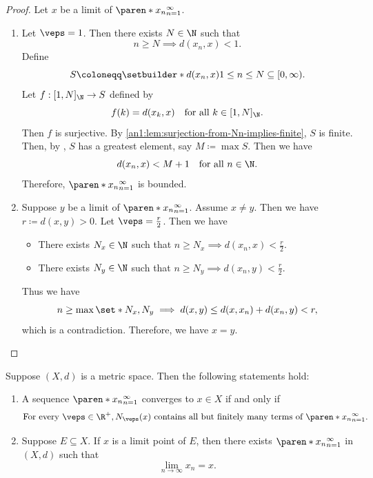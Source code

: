 \begin{proof}
  Let $x$ be a limit of $\paren*{x_{n}}_{n = 1}^{\infty}$.
  \begin{enumerate}[label=\textbf{(\Alph*)}]
    \item Let $\veps = 1$. Then there exists $N \in \N$ such that
          \[
            n \geq N \implies d(x_{n}, x) < 1.
          \]
          Define
          \[
            S \coloneqq \setbuilder*{d(x_{n}, x)}{1 \leq n \leq N} \subseteq [0, \infty).
          \]
          Let $f: [1, N]_{\N} \to S$ defined by
          \[
            f(k) = d(x_{k}, x) \quad \text{for all } k \in [1, N]_{\N}.
          \]
          Then $f$ is surjective. By \cref{an1:lem:surjection-from-Nn-implies-finite}, $S$ is finite. Then, by
          , $S$ has a greatest element, say $M \coloneqq \max S$. Then we have
          \[
            d(x_{n}, x) < M + 1 \quad \text{for all } n \in \N.
          \]
          Therefore, $\paren*{x_{n}}_{n = 1}^{\infty}$ is bounded.
    \item Suppose $y$ be a limit of $\paren*{x_{n}}_{n = 1}^{\infty}$. Assume $x \neq y$.
          Then we have $r \coloneqq d(x, y) > 0$. Let $\veps = \frac{r}{2}$. Then we have
          \begin{itemize}
            \item There exists $N_{x} \in \N$ such that $n \geq N_{x} \implies d(x_{n}, x) < \frac{r}{2}$.
            \item There exists $N_{y} \in \N$ such that $n \geq N_{y} \implies d(x_{n}, y) < \frac{r}{2}$.
          \end{itemize}
          Thus we have
          \[
            n \geq \max\set*{N_{x}, N_{y}} \implies d(x, y) \leq d(x, x_{n}) + d(x_{n}, y) < r,
          \]
          which is a contradiction. Therefore, we have $x = y$.
  \end{enumerate}
\end{proof}

\begin{theorem} \label{an1:thm:neighborhood}
  Suppose $(X, d)$ is a metric space. Then the following statements hold:
  \begin{enumerate}[label=\textbf{(\Alph*)}]
    \item A sequence $\paren*{x_{n}}_{n = 1}^{\infty}$ converges to $x \in X$ if and only if
          \[
            \text{For every } \veps \in \R^{+}, N_{\veps}(x) \text{ contains all but
              finitely many terms of } \paren*{x_{n}}_{n = 1}^{\infty}.
          \]
    \item Suppose $E \subseteq X$. If $x$ is a limit point of $E$, then there exists
          $\paren*{x_{n}}_{n = 1}^{\infty}$ in $(X, d)$ such that
          \[
            \lim_{n \to \infty} x_{n} = x.
          \]
  \end{enumerate}
\end{theorem}

